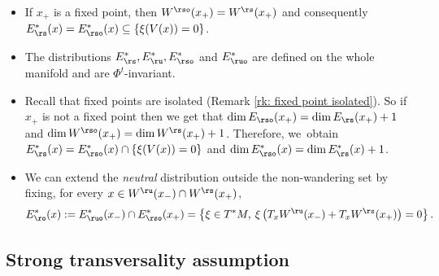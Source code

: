 \pagebreak[2]
\skpt
\begin{remark}
\begin{itemize}
\item If $x_+$ is a fixed point, then $W^{\rso} (x_+) = W^{\rs} (x_+)$ and consequently $E_\rs^*(x) = E_{\rso}^*(x) \subseteq \{\xi (V(x)) = 0 \}$.
\item The distributions $E_\rs^*, E_\ru^*, E_{\rso}^*$ and $E_{\ruo}^*$ are defined on the whole manifold and are $\Phi^t$-invariant.
\item Recall that fixed points are isolated (Remark \ref{rk: fixed point isolated}). So if $x_+$ is not a fixed point then we get that $\dim E_{\rso}(x_+) = \dim E_{\rs}(x_+) + 1$ and $\dim W^{\rso} (x_+) = \dim W^{\rs} (x_+) + 1$. Therefore, we~obtain $E_{\rs}^* (x) = E_{\rso}^* (x) \cap \{\xi (V(x)) = 0 \}$ and $\dim E_{\rso}^* (x) = \dim E_{\rs}^* (x) + 1$.
\item We can extend the \textit{neutral} distribution outside the non-wandering set by fixing, for every $x \in W^\ru (x_-) \cap W^\rs (x_+)$,
\[
E_\ro^* (x):= E_{\ruo}^* (x_-) \cap E_{\rso}^* (x_+) = \left\{ \xi \in T^* M, \: \xi \left(T_x W^{\ru} (x_-) + T_x W^{\rs} (x_+)\right) = 0 \right\}.
\]
\end{itemize}
\end{remark}

\subsection{Strong transversality assumption}


